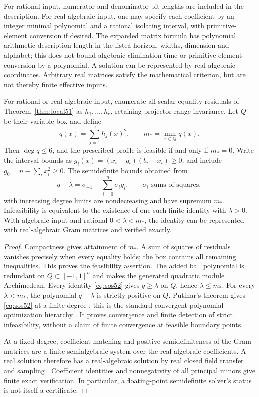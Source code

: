 For rational input, numerator and denominator bit lengths are included
in the description. For real-algebraic input, one may specify each
coefficient by an integer minimal polynomial and a rational isolating
interval, with primitive-element conversion if desired. The expanded
matrix formula has polynomial arithmetic description length in the
listed horizon, widths, dimension and alphabet; this does not bound
algebraic elimination time or primitive-element conversion by a
polynomial. A solution can be represented by real-algebraic
coordinates. Arbitrary real matrices satisfy the mathematical
criterion, but are not thereby finite effective inputs.

\begin{theorem}\label{thm:sos52}
For rational or real-algebraic input, enumerate all scalar equality
residuals of Theorem~\ref{thm:local51} as $h_1,\ldots,h_e$, retaining
projector-range invariance. Let $Q$ be their variable box and define
\[
 q(x)=\sum_{j=1}^e h_j(x)^2,\qquad m_* =\min_{x\in Q}q(x).
\]
Then $\deg q\le6$, and the prescribed profile is feasible if and
only if $m_*=0$. Write the interval bounds as
$g_i(x)=(x_i-a_i)(b_i-x_i)\ge0$, and include
$g_0=n-\sum_i x_i^2\ge0$. The semidefinite bounds obtained from
\begin{equation}\label{eq:sos52}
 q-\lambda=\sigma_{-1}+\sum_{i=0}^n\sigma_i g_i,
 \qquad \sigma_i\text{ sums of squares},
\end{equation}
with increasing degree limits are nondecreasing and have supremum
$m_*$. Infeasibility is equivalent to the existence of one such
finite identity with $\lambda>0$. With algebraic input and rational
$0<\lambda<m_*$, the identity can be represented with real-algebraic
Gram matrices and verified exactly.
\end{theorem}
\begin{proof}
Compactness gives attainment of $m_*$. A sum of squares of residuals
vanishes precisely when every equality holds; the box contains all
remaining inequalities. This proves the feasibility assertion.
The added ball polynomial is redundant on $Q\subset[-1,1]^n$ and
makes the generated quadratic module Archimedean. Every identity
\eqref{eq:sos52} gives $q\ge\lambda$ on $Q$, hence $\lambda\le m_*$.
For every $\lambda<m_*$, the polynomial $q-\lambda$ is strictly
positive on $Q$. Putinar's theorem gives \eqref{eq:sos52} at a finite
degree \cite{Putinar93}; this is the standard convergent polynomial
optimization hierarchy \cite{Lasserre01}. It proves convergence and
finite detection of strict infeasibility, without a claim of finite
convergence at feasible boundary points.

At a fixed degree, coefficient matching and positive-semidefiniteness
of the Gram matrices are a finite semialgebraic system over the
real-algebraic coefficients. A real solution therefore has a
real-algebraic solution by real closed field transfer and sampling
\cite{BPR}. Coefficient identities and nonnegativity of all principal
minors give finite exact verification. In particular, a floating-point
semidefinite solver's status is not itself a certificate.
\end{proof}

